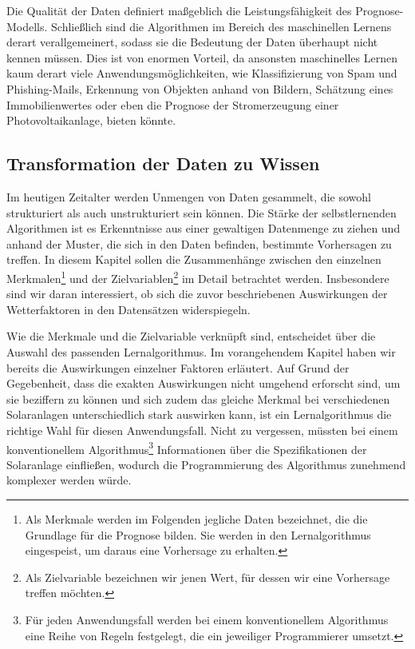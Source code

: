 \documentclass[12pt, a4paper]{article}
\begin{document}
Die Qualität der Daten definiert maßgeblich die Leistungsfähigkeit des Prognose-Modells. Schließlich sind die Algorithmen im Bereich des maschinellen Lernens derart verallgemeinert, sodass sie die Bedeutung der Daten überhaupt nicht kennen müssen. Dies ist von enormen Vorteil, da ansonsten maschinelles Lernen kaum derart viele Anwendungsmöglichkeiten, wie Klassifizierung von Spam und Phishing-Mails, Erkennung von Objekten anhand von Bildern, Schätzung eines Immobilienwertes oder eben die Prognose der Stromerzeugung einer Photovoltaikanlage, bieten könnte.

\subsection{Transformation der Daten zu Wissen}

Im heutigen Zeitalter werden Unmengen von Daten gesammelt, die sowohl strukturiert als auch unstrukturiert sein können. Die Stärke der selbstlernenden Algorithmen ist es Erkenntnisse aus einer gewaltigen Datenmenge zu ziehen und anhand der Muster, die sich in den Daten befinden, bestimmte Vorhersagen zu treffen. In diesem Kapitel sollen die Zusammenhänge zwischen den einzelnen Merkmalen\footnote{Als Merkmale werden im Folgenden jegliche Daten bezeichnet, die die Grundlage für die Prognose bilden. Sie werden in den Lernalgorithmus eingespeist, um daraus eine Vorhersage zu erhalten.} und der Zielvariablen\footnote{Als Zielvariable bezeichnen wir jenen Wert, für dessen wir eine Vorhersage treffen möchten.} im Detail betrachtet werden. Insbesondere sind wir daran interessiert, ob sich die zuvor beschriebenen Auswirkungen der Wetterfaktoren in den Datensätzen widerspiegeln.

Wie die Merkmale und die Zielvariable verknüpft sind, entscheidet über die Auswahl des passenden Lernalgorithmus. Im vorangehendem Kapitel haben wir bereits die Auswirkungen einzelner Faktoren erläutert. Auf Grund der Gegebenheit, dass die exakten Auswirkungen nicht umgehend erforscht sind, um sie beziffern zu können und sich zudem das gleiche Merkmal bei verschiedenen Solaranlagen unterschiedlich stark auswirken kann, ist ein Lernalgorithmus die richtige Wahl für diesen Anwendungsfall. Nicht zu vergessen, müssten bei einem konventionellem Algorithmus\footnote{Für jeden Anwendungsfall werden bei einem konventionellem Algorithmus eine Reihe von Regeln festgelegt, die ein jeweiliger Programmierer umsetzt.} Informationen über die Spezifikationen der Solaranlage einfließen, wodurch die Programmierung des Algorithmus zunehmend komplexer werden würde.
\end{document}
